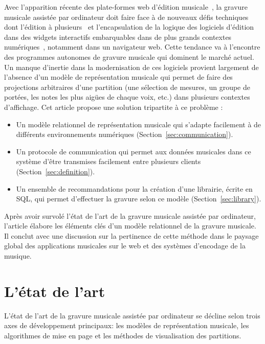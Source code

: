 \documentclass{article}
\begin{document}
Avec l'apparition récente des plate-formes web d'édition musicale~\cite{renz1998web}\-\cite{solomon2014deploiement},
la gravure musicale assistée par ordinateur doit faire face à de nouveaux
défis techniques dont l'édition à plusieurs~\cite{jorda2001system}\-\cite{bainbridge1999towards}\cite{viro2011peachnote}
et l'encapsulation de la logique des logiciels d'édition dans des widgets interactifs
embarquables dans de plus grands contextes numériques~\cite{agon2002programmation}\-\cite{laurson2002pwgl}\-\cite{guedy2013etudier}, notamment dans un navigateur web.
Cette tendance va à l'encontre des programmes autonomes de gravure musicale
qui dominent le marché actuel. Un manque d'inertie dans la modernisation de
ces logiciels provient largement de l'absence d'un modèle de représentation musicale
qui permet de faire des projections arbitraires d'une partition (une
sélection de mesures, un groupe de portées, les notes les plus aigües de chaque
voix, etc.) dans
plusieurs contextes d'affichage. Cet article propose une solution tripartite
à ce problème :
\begin{itemize}
\item Un modèle relationnel de représentation musicale qui s'adapte facilement à de
différents environnements numériques (Section~\ref{sec:communication}).
\item Un protocole de communication qui permet aux données musicales dans
ce système d'être transmises facilement entre plusieurs clients
(Section~\ref{sec:definition}).
\item Un ensemble de recommandations pour la création d'une librairie,
écrite en SQL, qui permet d'effectuer la gravure selon ce modèle (Section~\ref{sec:library}).
\end{itemize}
Après avoir survolé l'état de l'art de la gravure musicale assistée par ordinateur,
l'article élabore les éléments clés d'un modèle relationnel de la gravure
musicale. Il conclut avec une discussion sur la pertinence de cette méthode
dans le paysage global des applications musicales sur le web et des
systèmes d'encodage de la musique.

\section{L'état de l'art}
L'état de l'art de la gravure musicale assistée par ordinateur se décline selon trois
axes de développement principaux: les modèles de représentation musicale,
les algorithmes de mise en page et les méthodes de visualisation des
partitions.
\end{document}

